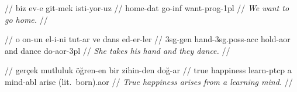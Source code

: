 \documentclass{article}
\begin{document}
\ex
\begingl
\gla {}    //
\glb biz ev-e git-mek isti-yor-uz //
 home-{\sc dat} go-{\sc inf} want-{\sc prog}-{\sc 1pl} //
\glft \textit{We want to go home.} //
\endgl
\xe

\ex
\begingl
\gla {}       //
\glb o on-un el-i-ni tut-ar ve dans ed-er-ler //
 {\sc 3sg}-{\sc gen} hand-{\sc 3sg.poss}-{\sc acc} hold-{\sc aor} and dance do-{\sc aor}-{\sc 3pl} //
\glft \textit{She takes his hand and they dance.} //
\endgl
\xe

\ex
\begingl
\gla {}      //
\glb ger\c{c}ek mutluluk \"{o}\u{g}ren-en bir zihin-den do\u{g}-ar //
\glc true happiness learn-{\sc ptcp} a mind-{\sc abl} {arise (lit.\ born).{\sc aor}} //
\glft \textit{True happiness arises from a learning mind.} //
\endgl
\xe
\end{document}
